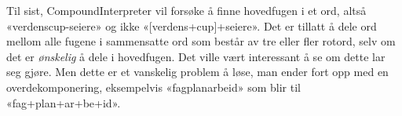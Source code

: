 \begin{items}
\item Til sist, CompoundInterpreter vil forsøke å finne hovedfugen i et ord, altså «verdenscup-seiere» og ikke «[verdens+cup]+seiere». Det er tillatt å dele ord mellom alle fugene i sammensatte ord som består av tre eller fler rotord, selv om det er \textit{ønskelig} å dele i hovedfugen. Det ville vært interessant å se om dette lar seg gjøre. Men dette er et vanskelig problem å løse, man ender fort opp med en overdekomponering, eksempelvis «fagplanarbeid» som blir til «fag+plan+ar+be+id».
\end{items}


